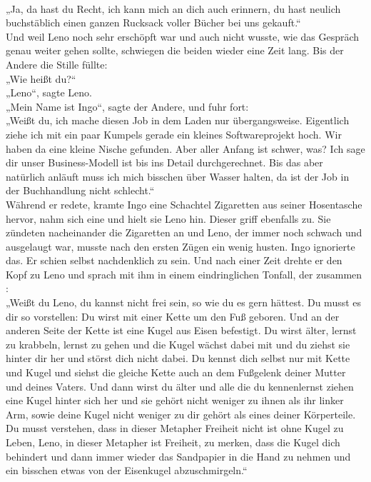 \documentclass[ngerman,smalldemyvopaper,11pt,oneside,onecolumn,openright,extrafontsizes]{memoir}
\begin{document}
\vspace{0.5em} \\
„Ja, da hast du Recht, ich kann mich an dich auch erinnern, du hast neulich buchstäblich einen ganzen Rucksack voller Bücher bei uns gekauft.“
\vspace{0.5em} \\
Und weil Leno noch sehr erschöpft war und auch nicht wusste, wie das Gespräch genau weiter gehen sollte, schwiegen die beiden wieder eine Zeit lang. Bis der Andere die Stille füllte:
\vspace{0.5em} \\
„Wie heißt du?“
\vspace{0.5em} \\
„Leno“, sagte Leno.
\vspace{0.5em} \\
„Mein Name ist Ingo“, sagte der Andere, und fuhr fort:
\vspace{0.5em} \\
„Weißt du, ich mache diesen Job in dem Laden nur übergangsweise. Eigentlich ziehe ich mit ein paar Kumpels gerade ein kleines Softwareprojekt hoch. Wir haben da eine kleine Nische gefunden. Aber aller Anfang ist schwer, was? Ich sage dir unser Business-Modell ist bis ins Detail durchgerechnet. Bis das aber natürlich anläuft muss ich mich bisschen über Wasser halten, da ist der Job in der Buchhandlung nicht schlecht.“
\vspace{0.5em} \\
Während er redete, kramte Ingo eine Schachtel Zigaretten aus seiner Hosentasche hervor, nahm sich eine und hielt sie Leno hin. Dieser griff ebenfalls zu. Sie zündeten nacheinander die Zigaretten an und Leno, der immer noch schwach und ausgelaugt war, musste nach den ersten Zügen ein wenig husten. Ingo ignorierte das. Er schien selbst nachdenklich zu sein. Und nach einer Zeit drehte er den Kopf zu Leno und sprach mit ihm in einem eindringlichen Tonfall, der zusammen :
\vspace{0.5em} \\
„Weißt du Leno, du kannst nicht frei sein, so wie du es gern hättest. Du musst es dir so vorstellen: Du wirst mit einer Kette um den Fuß geboren. Und an der anderen Seite der Kette ist eine Kugel aus Eisen befestigt. Du wirst älter, lernst zu krabbeln, lernst zu gehen und die Kugel wächst dabei mit und du ziehst sie hinter dir her und störst dich nicht dabei. Du kennst dich selbst nur mit Kette und Kugel und siehst die gleiche Kette auch an dem Fußgelenk deiner Mutter und deines Vaters. Und dann wirst du älter und alle die du kennenlernst ziehen eine Kugel hinter sich her und sie gehört nicht weniger zu ihnen als ihr linker Arm, sowie deine Kugel nicht weniger zu dir gehört als eines deiner Körperteile.\\
Du musst verstehen, dass in dieser Metapher Freiheit nicht ist ohne Kugel zu Leben, Leno, in dieser Metapher ist Freiheit, zu merken, dass die Kugel dich behindert und dann immer wieder das Sandpapier in die Hand zu nehmen und ein bisschen etwas von der Eisenkugel abzuschmirgeln.“
\end{document}
